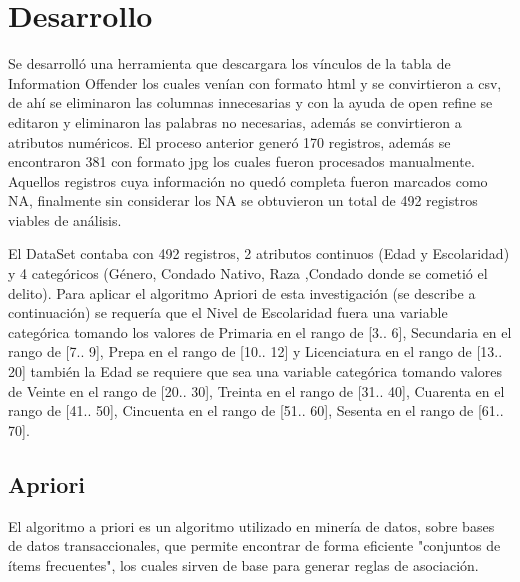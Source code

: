 \documentclass[sigconf]{acmart}
\begin{document}
\section{Desarrollo}
Se desarrolló una herramienta que descargara los vínculos de la tabla de Information Offender los cuales venían con formato html y se convirtieron a csv, de ahí se eliminaron las columnas innecesarias y con la ayuda de open refine se editaron y eliminaron las palabras no necesarias, además se convirtieron a atributos numéricos. El proceso anterior generó 170 registros, además se encontraron 381 con formato jpg los cuales fueron procesados manualmente.
Aquellos registros cuya información no quedó completa fueron marcados como NA, finalmente sin considerar los NA se obtuvieron un total de 492 registros viables de análisis.


El DataSet contaba con 492 registros, 2 atributos continuos (Edad y Escolaridad) y 4 categóricos (Género, Condado Nativo, Raza ,Condado donde se cometió el delito). Para aplicar el algoritmo Apriori de esta investigación (se describe a continuación) se requería que el Nivel de Escolaridad fuera una variable categórica tomando los valores de Primaria en el rango de [3.. 6], Secundaria en el rango de  [7.. 9], Prepa en el rango de  [10.. 12] y Licenciatura en el rango de  [13.. 20] también la Edad se requiere que sea una variable categórica tomando valores de Veinte en el rango de [20.. 30], Treinta en el rango de [31.. 40], Cuarenta en el rango de [41.. 50], Cincuenta en el rango de [51.. 60], Sesenta en el rango de [61.. 70].

\subsection{Apriori}
El algoritmo a priori es un algoritmo utilizado en minería de datos, sobre bases de datos transaccionales, que permite encontrar de forma eficiente "conjuntos de ítems frecuentes", los cuales sirven de base para generar reglas de asociación.
\end{document}
